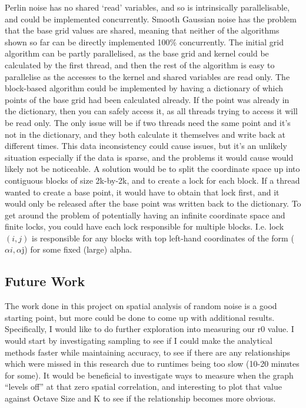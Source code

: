 \documentclass[11pt,a4paper]{article}
\begin{document}
Perlin noise has no shared ‘read’ variables, and so is intrinsically parallelisable, and could be implemented concurrently. Smooth Gaussian noise has the problem that the base grid values are shared, meaning that neither of the algorithms shown so far can be directly implemented 100\% concurrently. The initial grid algorithm can be partly parallelised, as the base grid and kernel could be calculated by the first thread, and then the rest of the algorithm is easy to parallelise as the accesses to the kernel and shared variables are read only. The block-based algorithm could be implemented by having a dictionary of which points of the base grid had been calculated already. If the point was already in the dictionary, then you can safely access it, as all threads trying to access it will be read only. The only issue will be if two threads need the same point and it’s not in the dictionary, and they both calculate it themselves and write back at different times. This data inconsistency could cause issues, but it's an unlikely situation especially if the data is sparse, and the problems it would cause would likely not be noticeable. A solution would be to split the coordinate space up into contiguous blocks of size 2k-by-2k, and to create a lock \cite{threads} for each block. If a thread wanted to create a base point, it would have to obtain that lock first, and it would only be released after the base point was written back to the dictionary. To get around the problem of potentially having an infinite coordinate space and finite locks, you could have each lock responsible for multiple blocks. I.e. lock $(i,j)$ is responsible for any blocks with top left-hand coordinates of the form ($\alpha i,\alpha $j) for some fixed (large) alpha.

\subsection{Future Work}

The work done in this project on spatial analysis of random noise is a good starting point, but more could be done to come up with additional results. Specifically, I would like to do further exploration into measuring our r0 value. I would start by investigating sampling to see if I could make the analytical methods faster while maintaining accuracy, to see if there are any relationships which were missed in this research due to runtimes being too slow (10-20 minutes for some). It would be beneficial to investigate ways to measure when the graph “levels off” at that zero spatial correlation, and interesting to plot that value against Octave Size and K to see if the relationship becomes more obvious.
\end{document}
